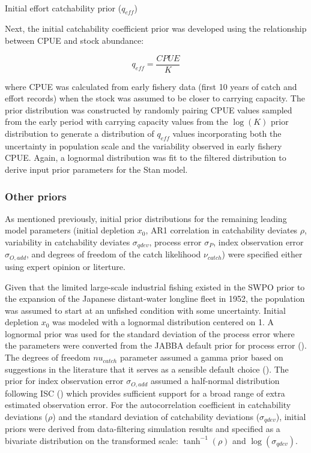 \documentclass[
  11pt,
]{SCreport}
\makeatletter
\let\oldparagraph\paragraph
\renewcommand{\paragraph}{
    \@ifstar
      \xxxParagraphStar
      \xxxParagraphNoStar
  }
\newcommand{\xxxParagraphStar}[1]{\oldparagraph*{#1}\mbox{}}
\newcommand{\xxxParagraphNoStar}[1]{\oldparagraph{#1}\mbox{}}
\makeatother
\begin{document}
\paragraph{\texorpdfstring{Initial effort catchability prior
(\(q_{eff}\))}{Initial effort catchability prior (q\_\{eff\})}}\label{initial-effort-catchability-prior-q_eff}

Next, the initial catchability coefficient prior was developed using the
relationship between CPUE and stock abundance:

\[q_{eff} = \frac{CPUE}{K}\]

where CPUE was calculated from early fishery data (first 10 years of
catch and effort records) when the stock was assumed to be closer to
carrying capacity. The prior distribution was constructed by randomly
pairing CPUE values sampled from the early period with carrying capacity
values from the \(\log(K)\) prior distribution to generate a
distribution of \(q_{eff}\) values incorporating both the uncertainty in
population scale and the variability observed in early fishery CPUE.
Again, a lognormal distribution was fit to the filtered distribution to
derive input prior parameters for the Stan model.

\subsubsection{Other priors}\label{sec-other-priors}

As mentioned previously, initial prior distributions for the remaining
leading model parameters (initial depletion \(x_0\), AR1 correlation in
catchability deviates \(\rho\), variability in catchability deviates
\(\sigma_{qdev}\), process error \(\sigma_P\), index observation error
\(\sigma_{O,add}\), and degrees of freedom of the catch likelihood
\(\nu_{catch}\)) were specified either using expert opinion or
literture.

Given that the limited large-scale industrial fishing existed in the
SWPO prior to the expansion of the Japanese distant-water longline fleet
in 1952, the population was assumed to start at an unfished condition
with some uncertainty. Initial depletion \(x_0\) was modeled with a
lognormal distribution centered on 1. A lognormal prior was used for the
standard deviation of the process error where the parameters were
converted from the JABBA default prior for process error
(). The degrees of
freedom \(nu_{catch}\) parameter assumed a gamma prior based on
suggestions in the literature that it serves as a sensible default
choice ().
The prior for index observation error \(\sigma_{O,add}\) assumed a
half-normal distribution following ISC
() which provides sufficient support
for a broad range of extra estimated observation error. For the
autocorrelation coefficient in catchability deviations (\(\rho\)) and
the standard deviation of catchability deviations (\(\sigma_{qdev}\)),
initial priors were derived from data-filtering simulation results and
specified as a bivariate distribution on the transformed scale:
\(\tanh^{-1}(\rho)\) and \(\log(\sigma_{qdev})\).
\end{document}
